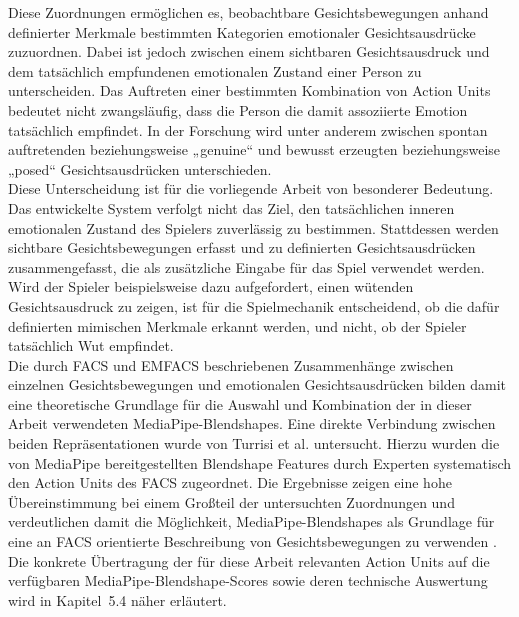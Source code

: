 \documentclass[intern]{cgMA}
\begin{document}
Diese Zuordnungen ermöglichen es, beobachtbare Gesichtsbewegungen anhand definierter Merkmale bestimmten Kategorien emotionaler Gesichtsausdrücke zuzuordnen. Dabei ist jedoch zwischen einem sichtbaren Gesichtsausdruck und dem tatsächlich empfundenen emotionalen Zustand einer Person zu unterscheiden. Das Auftreten einer bestimmten Kombination von Action Units bedeutet nicht zwangsläufig, dass die Person die damit assoziierte Emotion tatsächlich empfindet. In der Forschung wird unter anderem zwischen spontan auftretenden beziehungsweise „genuine“ und bewusst erzeugten beziehungsweise „posed“ Gesichtsausdrücken unterschieden. \cite{genuinePosedExpression}\\
Diese Unterscheidung ist für die vorliegende Arbeit von besonderer Bedeutung. Das entwickelte System verfolgt nicht das Ziel, den tatsächlichen inneren emotionalen Zustand des Spielers zuverlässig zu bestimmen. Stattdessen werden sichtbare Gesichtsbewegungen erfasst und zu definierten Gesichtsausdrücken zusammengefasst, die als zusätzliche Eingabe für das Spiel verwendet werden. Wird der Spieler beispielsweise dazu aufgefordert, einen wütenden Gesichtsausdruck zu zeigen, ist für die Spielmechanik entscheidend, ob die dafür definierten mimischen Merkmale erkannt werden, und nicht, ob der Spieler tatsächlich Wut empfindet.\\
Die durch FACS und EMFACS beschriebenen Zusammenhänge zwischen einzelnen
Gesichtsbewegungen und emotionalen Gesichtsausdrücken bilden damit eine
theoretische Grundlage für die Auswahl und Kombination der in dieser
Arbeit verwendeten MediaPipe-Blendshapes. Eine direkte Verbindung
zwischen beiden Repräsentationen wurde von Turrisi et al. untersucht.
Hierzu wurden die von MediaPipe bereitgestellten Blendshape Features
durch Experten systematisch den Action Units des FACS zugeordnet.
Die Ergebnisse zeigen eine hohe Übereinstimmung bei einem Großteil der
untersuchten Zuordnungen und verdeutlichen damit die Möglichkeit,
MediaPipe-Blendshapes als Grundlage für eine an FACS orientierte
Beschreibung von Gesichtsbewegungen zu verwenden
\cite{turrisi2026blendshape}.\\
Die konkrete Übertragung der für diese Arbeit relevanten Action Units
auf die verfügbaren MediaPipe-Blendshape-Scores sowie deren technische
Auswertung wird in Kapitel~5.4 näher erläutert.
\end{document}
